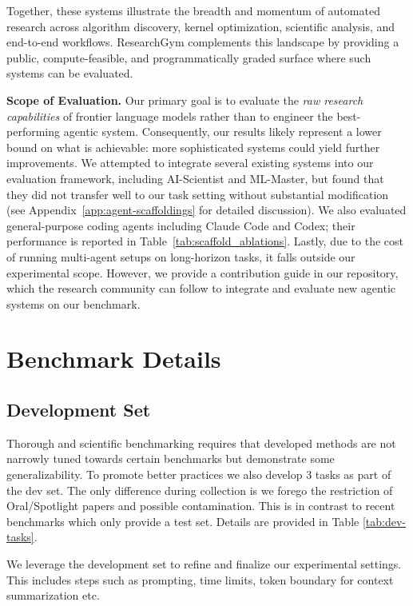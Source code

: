 \documentclass[11pt]{article}
\theoremstyle{plain}
\theoremstyle{definition}
\theoremstyle{remark}
\begin{document}
Together, these systems illustrate the breadth and momentum of automated research across algorithm discovery, kernel optimization, scientific analysis, and end-to-end workflows. 
ResearchGym complements this landscape by providing a public, compute-feasible, and programmatically graded surface where such systems can be evaluated.

\textbf{Scope of Evaluation.} Our primary goal is to evaluate the \emph{raw research capabilities} of frontier language models rather than to engineer the best-performing agentic system. Consequently, our results likely represent a lower bound on what is achievable: more sophisticated systems could yield further improvements. We attempted to integrate several existing systems into our evaluation framework, including AI-Scientist and ML-Master, but found that they did not transfer well to our task setting without substantial modification (see Appendix~\ref{app:agent-scaffoldings} for detailed discussion). We also evaluated general-purpose coding agents including Claude Code and Codex; their performance is reported in Table~\ref{tab:scaffold_ablations}. Lastly, due to the cost of running multi-agent setups on long-horizon tasks, it falls outside our experimental scope. However, we provide a contribution guide in our repository, which the research community can follow to integrate and evaluate new agentic systems on our benchmark. 

\section{Benchmark Details} \label{app:benchmark-details}

\subsection{Development Set} \label{app:dev-set}

Thorough and scientific benchmarking requires that developed methods are not narrowly tuned towards certain benchmarks but demonstrate some generalizability. To promote better practices we also develop 3 tasks as part of the dev set. The only difference during collection is we forego the restriction of Oral/Spotlight papers and possible contamination. This is in contrast to recent benchmarks which only provide a test set. Details are provided in Table \ref{tab:dev-tasks}.

We leverage the development set to refine and finalize our experimental settings. This includes steps such as prompting, time limits, token boundary for context summarization etc.
\end{document}
